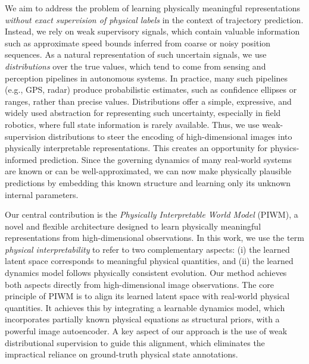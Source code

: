 \documentclass[sigconf]{acmart}
\begin{document}
We aim to address the problem of learning physically meaningful representations \textit{without exact supervision of physical labels} in the context of trajectory prediction. Instead, we rely on weak supervisory signals, which contain valuable information such as approximate speed bounds inferred from coarse or noisy position sequences. As a natural representation of such uncertain signals, we use \textit{distributions} over the true values, which tend to come from sensing and perception pipelines in autonomous systems. In practice, many such pipelines (e.g., GPS, radar) produce probabilistic estimates, such as confidence ellipses or ranges, rather than precise values. Distributions offer a simple, expressive, and widely used abstraction for representing such uncertainty, especially in field robotics, where full state information is rarely available. Thus, we use weak-supervision distributions to steer the encoding of high-dimensional images into physically interpretable representations. This creates an opportunity for physics-informed prediction. Since the governing dynamics of many real-world systems are known or can be well-approximated, we can now make physically plausible predictions by embedding this known structure and learning only its unknown internal parameters.





Our central contribution is the \textit{Physically Interpretable World Model} (PIWM), a novel and flexible architecture designed to learn physically meaningful representations from high-dimensional observations. In this work, we use the term \emph{physical interpretability} to refer to two complementary aspects: 
(i) the learned latent space corresponds to meaningful physical quantities, and 
(ii) the learned dynamics model follows physically consistent evolution. 
Our method achieves both aspects directly from high-dimensional image observations.
The core principle of PIWM is to align its learned latent space with real-world physical quantities. It achieves this by integrating a learnable dynamics model, which incorporates partially known physical equations as structural priors, with a powerful image autoencoder. A key aspect of our approach is the use of weak distributional supervision to guide this alignment, which eliminates the impractical reliance on ground-truth physical state annotations.
\end{document}
